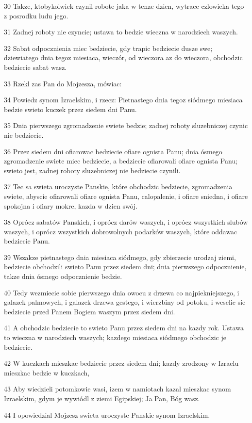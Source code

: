 \par 30 Takze, ktobykolwiek czynil robote jaka w tenze dzien, wytrace czlowieka tego z posrodku ludu jego.
\par 31 Zadnej roboty nie czyncie; ustawa to bedzie wieczna w narodziech waszych.
\par 32 Sabat odpocznienia miec bedziecie, gdy trapic bedziecie dusze swe; dziewiatego dnia tegoz miesiaca, wieczór, od wieczora az do wieczora, obchodzic bedziecie sabat wasz.
\par 33 Rzekl zas Pan do Mojzesza, mówiac:
\par 34 Powiedz synom Izraelskim, i rzecz: Pietnastego dnia tegoz siódmego miesiaca bedzie swieto kuczek przez siedem dni Panu.
\par 35 Dnia pierwszego zgromadzenie swiete bedzie; zadnej roboty sluzebniczej czynic nie bedziecie.
\par 36 Przez siedem dni ofiarowac bedziecie ofiare ognista Panu; dnia ósmego zgromadzenie swiete miec bedziecie, a bedziecie ofiarowali ofiare ognista Panu; swieto jest, zadnej roboty sluzebniczej nie bedziecie czynili.
\par 37 Tec sa swieta uroczyste Panskie, które obchodzic bedziecie, zgromadzenia swiete, abyscie ofiarowali ofiare ognista Panu, calopalenie, i ofiare sniedna, i ofiare spokojna i ofiary mokre, kazda w dzien swój.
\par 38 Oprócz sabatów Panskich, i oprócz darów waszych, i oprócz wszystkich slubów waszych, i oprócz wszystkich dobrowolnych podarków waszych, które oddawac bedziecie Panu.
\par 39 Wszakze pietnastego dnia miesiaca siódmego, gdy zbierzecie urodzaj ziemi, bedziecie obchodzili swieto Panu przez siedem dni; dnia pierwszego odpocznienie, takze dnia ósmego odpocznienie bedzie.
\par 40 Tedy wezmiecie sobie pierwszego dnia owocu z drzewa co najpiekniejszego, i galazek palmowych, i galazek drzewa gestego, i wierzbiny od potoku, i weselic sie bedziecie przed Panem Bogiem waszym przez siedem dni.
\par 41 A obchodzic bedziecie to swieto Panu przez siedem dni na kazdy rok. Ustawa to wieczna w narodziech waszych; kazdego miesiaca siódmego obchodzic je bedziecie.
\par 42 W kuczkach mieszkac bedziecie przez siedem dni; kazdy zrodzony w Izraelu mieszkac bedzie w kuczkach,
\par 43 Aby wiedzieli potomkowie wasi, izem w namiotach kazal mieszkac synom Izraelskim, gdym je wywiódl z ziemi Egipskiej; Ja Pan, Bóg wasz.
\par 44 I opowiedzial Mojzesz swieta uroczyste Panskie synom Izraelskim.

